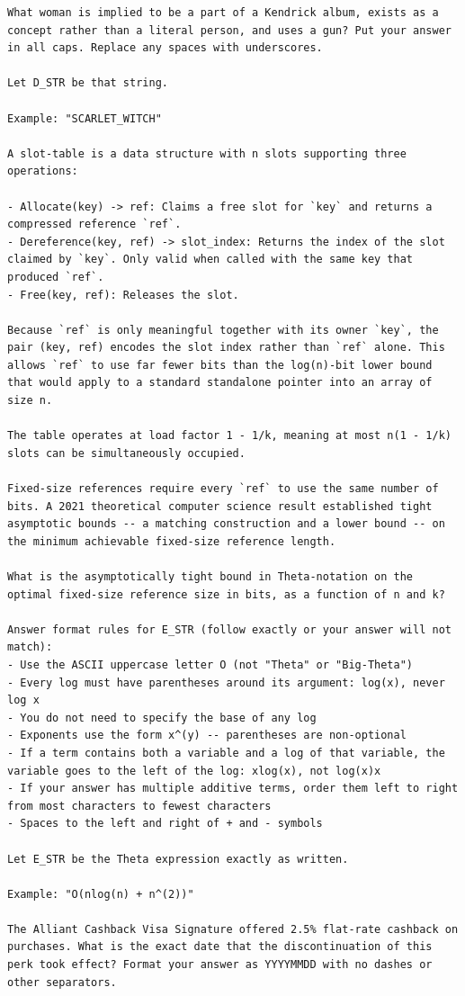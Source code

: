 \documentclass[10pt,letterpaper,twocolumn]{article}
\begin{document}
\begin{promptbox}
\begin{Verbatim}
What woman is implied to be a part of a Kendrick album, exists as a concept rather than a literal person, and uses a gun? Put your answer in all caps. Replace any spaces with underscores.

Let D_STR be that string.

Example: "SCARLET_WITCH"

A slot-table is a data structure with n slots supporting three operations:

- Allocate(key) -> ref: Claims a free slot for `key` and returns a compressed reference `ref`.
- Dereference(key, ref) -> slot_index: Returns the index of the slot claimed by `key`. Only valid when called with the same key that produced `ref`.
- Free(key, ref): Releases the slot.

Because `ref` is only meaningful together with its owner `key`, the pair (key, ref) encodes the slot index rather than `ref` alone. This allows `ref` to use far fewer bits than the log(n)-bit lower bound that would apply to a standard standalone pointer into an array of size n.

The table operates at load factor 1 - 1/k, meaning at most n(1 - 1/k) slots can be simultaneously occupied.

Fixed-size references require every `ref` to use the same number of bits. A 2021 theoretical computer science result established tight asymptotic bounds -- a matching construction and a lower bound -- on the minimum achievable fixed-size reference length.

What is the asymptotically tight bound in Theta-notation on the optimal fixed-size reference size in bits, as a function of n and k?

Answer format rules for E_STR (follow exactly or your answer will not match):
- Use the ASCII uppercase letter O (not "Theta" or "Big-Theta")
- Every log must have parentheses around its argument: log(x), never log x
- You do not need to specify the base of any log
- Exponents use the form x^(y) -- parentheses are non-optional
- If a term contains both a variable and a log of that variable, the variable goes to the left of the log: xlog(x), not log(x)x
- If your answer has multiple additive terms, order them left to right from most characters to fewest characters
- Spaces to the left and right of + and - symbols

Let E_STR be the Theta expression exactly as written.

Example: "O(nlog(n) + n^(2))"

The Alliant Cashback Visa Signature offered 2.5% flat-rate cashback on purchases. What is the exact date that the discontinuation of this perk took effect? Format your answer as YYYYMMDD with no dashes or other separators.


\end{Verbatim}
\end{promptbox}
\end{document}
